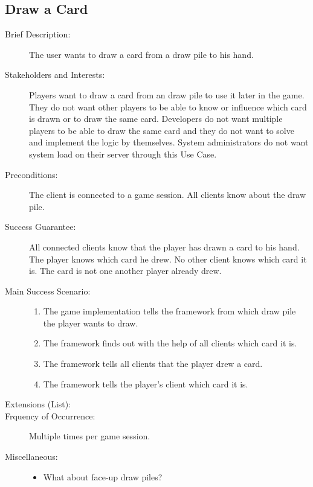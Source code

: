 \subsection{Draw a Card}

\begin{description}
  \item[Brief Description:] The user wants to draw a card from a \gls{draw
  pile} to his \gls{hand}.
  \item[Stakeholders and Interests:] Players want to draw a card from an
  \gls{draw pile} to use it later in the game. They do not want other players
  to be able to know or influence which card is drawn or to draw the same card.
  Developers do not want multiple players to be able to draw the same card and
  they do not want to solve and implement the logic by themselves. System
  administrators do not want system load on their server through this Use Case.
  \item[Preconditions:] The client is connected to a game session. All clients
  know about the \gls{draw pile}.
  \item[Success Guarantee:] All connected clients know that the player has drawn
  a card to his hand. The player knows which card he drew. No other client knows
  which card it is. The card is not one another player already drew.
  \item[Main Success Scenario:] \hfill
  \begin{enumerate}
    \item \label{itm:drawcard_telldrawpile} The game implementation tells the
    framework from which \gls{draw pile} the player wants to draw.
    \item The framework finds out with the help of all clients which card it is.
    \item The framework tells all clients that the player drew a card.
    \item The framework tells the player's client which card it is.
  \end{enumerate}
  \item[Extensions (List):] \hfill
  \item[Frquency of Occurrence:] Multiple times per game session.
  \item[Miscellaneous:] \hfill
  \begin{itemize}
    \item What about \gls{face}-up \glspl{draw pile}?
  \end{itemize}
\end{description}
